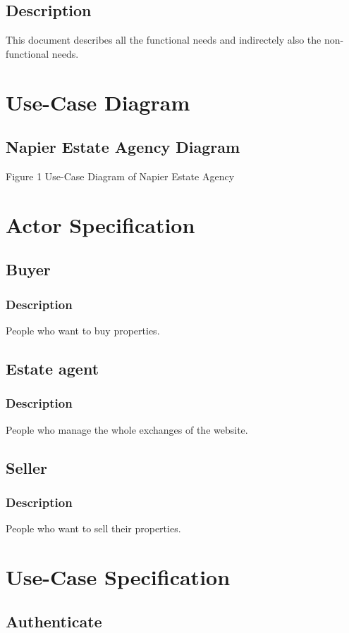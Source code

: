 \documentclass[a4paper,12pt]{article}
\begin{document}
\subsection{Description}
This document describes all the functional needs and indirectely also the non-functional needs.
 
\section{Use-Case Diagram}
\subsection{Napier Estate Agency Diagram}
Figure 1 Use-Case Diagram of Napier Estate Agency

 
\section{Actor Specification}
\subsection{Buyer}
\subsubsection{Description}
People who want to buy properties.
\subsection{Estate agent}
\subsubsection{Description}
People who manage the whole exchanges of the website.
\subsection{Seller}
\subsubsection{Description}
People who want to sell their properties.

 
\section{Use-Case Specification}
\subsection{Authenticate}
\end{document}
